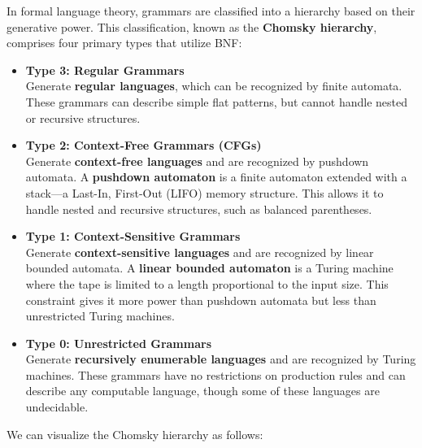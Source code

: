 \begin{Def}

    In formal language theory, grammars are classified into a hierarchy based on their generative power. This classification, known as the \textbf{Chomsky hierarchy}, comprises four primary types that utilize BNF:

    \begin{itemize}
        \item \textbf{Type 3: Regular Grammars} \\
        Generate \textbf{regular languages}, which can be recognized by finite automata. These grammars can describe simple flat patterns, but cannot handle nested or recursive structures.

        \item \textbf{Type 2: Context-Free Grammars (CFGs)} \\
        Generate \textbf{context-free languages} and are recognized by pushdown automata. A \textbf{pushdown automaton} is a finite automaton extended with a stack—a Last-In, First-Out (LIFO) memory structure. This allows it to handle nested and recursive structures, such as balanced parentheses.

        \item \textbf{Type 1: Context-Sensitive Grammars} \\
        Generate \textbf{context-sensitive languages} and are recognized by linear bounded automata. A \textbf{linear bounded automaton} is a Turing machine where the tape is limited to a length proportional to the input size. This constraint gives it more power than pushdown automata but less than unrestricted Turing machines.

        \item \textbf{Type 0: Unrestricted Grammars} \\
        Generate \textbf{recursively enumerable languages} and are recognized by Turing machines. These grammars have no restrictions on production rules and can describe any computable language, though some of these languages are undecidable.
    \end{itemize}
\end{Def}

\newpage 

\noindent
We can visualize the Chomsky hierarchy as follows:


